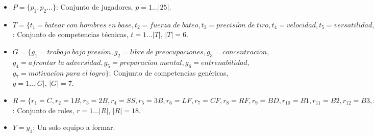 \begin{table}[H]
	\centering
	\caption{Tipos de Roles}\label{tipo-roles}
\end{table}

\begin{itemize}	
	\item $P=\{p_1, p_2\ldots\}$: Conjunto de jugadores, $p = 1...|25|$.
	
	\item $T=\{t_1=batear\;con\;hombres\;en\;base, t_2=fuerza\;de\;bateo, t_3=precisi\acute{o}n\;de\;tiro, t_4=velocidad, t_5=versatilidad, t_6=capacidad\;de\;embase\}$: Conjunto de competencias técnicas, $t= 1\ldots|T|$, $|T|=6$. \label{compt-pel}
	
	\item $G=\{g_1=trabajo\;bajo\;presi\acute{o}n
	, g_2=libre\;de\;preocupaciones, g_3=concentraci\acute{o}n,$ $g_4=afrontar\;la\;adversidad, g_5=preparaci\acute{o}n\;mental, g_6=entrenabilidad,$ $g_7=motivaci\acute{o}n\;para\;el\;logro\}$: Conjunto de competencias genéricas, $g= 1\ldots |G|$, $|G|=7$.
	
	\item $R=\{r_1=C,r_2=1B,r_3=2B,r_4=SS,r_5=3B,r_6=LF,r_7=CF,r_8=RF,r_{9}=BD,r_{10}=B1,r_{11}=B2,r_{12}=B3,r_{13}=B4,r_{14}=B5,r_{15}=B6, r_{16}=B7,r_{17}=B8,r_{18}=B9\}$: Conjunto de roles, $r = 1\ldots |R|$, $|R|=18$. \label{def-roles-pel} 
	
	\item $Y={y_1}$: Un solo equipo a formar.
	
\end{itemize}


